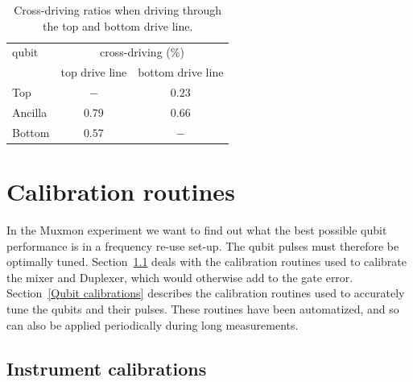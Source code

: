      \vspace{2cm}
      \begin{table}[h]
        \begin{tabular}{l c c}
          \toprule
          qubit & \multicolumn{2}{c}{cross-driving (\%)} \\
          \cmidrule(lr){2-3}
               & top drive line & bottom drive line \\
          \midrule
          Top     & $-$    & $0.23$ \\
          Ancilla & $0.79$ & $0.66$ \\
          Bottom  & $0.57$ & $-$    \\
          \bottomrule
        \end{tabular}
        \caption{Cross-driving ratios when driving through the top and bottom drive line.}
        \label{tab:cross-driving}
      \end{table}

  \chapter{Calibration routines}
    \label{ch:Calibration routines}
    In the Muxmon experiment we want to find out what the best possible qubit performance is in a frequency re-use set-up. The qubit pulses must therefore be optimally tuned. Section~\ref{Instrument calibrations} deals with the calibration routines used to calibrate the mixer and Duplexer, which would otherwise add to the gate error. Section~\ref{Qubit calibrations} describes the calibration routines used to accurately tune the qubits and their pulses. These routines have been automatized, and so can also be applied periodically during long measurements.

    \section{Instrument calibrations}
      \label{Instrument calibrations}

